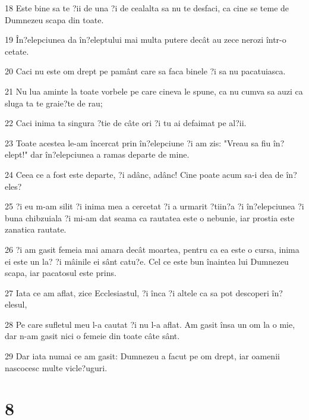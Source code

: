 \par 18 Este bine sa te ?ii de una ?i de cealalta sa nu te desfaci, ca cine se teme de Dumnezeu scapa din toate.
\par 19 În?elepciunea da în?eleptului mai multa putere decât au zece nerozi într-o cetate.
\par 20 Caci nu este om drept pe pamânt care sa faca binele ?i sa nu pacatuiasca.
\par 21 Nu lua aminte la toate vorbele pe care cineva le spune, ca nu cumva sa auzi ca sluga ta te graie?te de rau;
\par 22 Caci inima ta singura ?tie de câte ori ?i tu ai defaimat pe al?ii.
\par 23 Toate acestea le-am încercat prin în?elepciune ?i am zis: "Vreau sa fiu în?elept!" dar în?elepciunea a ramas departe de mine.
\par 24 Ceea ce a fost este departe, ?i adânc, adânc! Cine poate acum sa-i dea de în?eles?
\par 25 ?i eu m-am silit ?i inima mea a cercetat ?i a urmarit ?tiin?a ?i în?elepciunea ?i buna chibzuiala ?i mi-am dat seama ca rautatea este o nebunie, iar prostia este zanatica rautate.
\par 26 ?i am gasit femeia mai amara decât moartea, pentru ca ea este o cursa, inima ei este un la? ?i mâinile ei sânt catu?e. Cel ce este bun înaintea lui Dumnezeu scapa, iar pacatosul este prins.
\par 27 Iata ce am aflat, zice Ecclesiastul, ?i înca ?i altele ca sa pot descoperi în?elesul,
\par 28 Pe care sufletul meu l-a cautat ?i nu l-a aflat. Am gasit însa un om la o mie, dar n-am gasit nici o femeie din toate câte sânt.
\par 29 Dar iata numai ce am gasit: Dumnezeu a facut pe om drept, iar oamenii nascocesc multe vicle?uguri.

\chapter{8}

